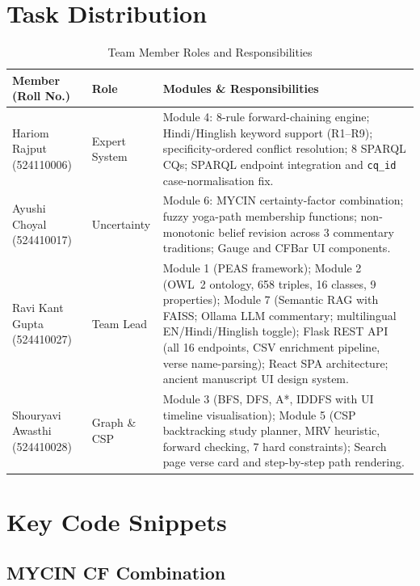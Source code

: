\documentclass[conference]{IEEEtran}
\begin{document}
\section{Task Distribution}

\begin{table}[htbp]
\caption{Team Member Roles and Responsibilities}
\label{tab:tasks}
\centering
\small
\begin{tabular}{p{2.5cm}p{1.8cm}p{10.6cm}}
\toprule
\textbf{Member (Roll No.)} & \textbf{Role} & \textbf{Modules \& Responsibilities} \\
\midrule
Hariom Rajput \newline (524110006)
  & Expert System
  & Module 4: 8-rule forward-chaining engine; Hindi/Hinglish keyword support (R1--R9); specificity-ordered conflict resolution; 8 SPARQL CQs; SPARQL endpoint integration and \texttt{cq\_id} case-normalisation fix. \\
\midrule
Ayushi Choyal \newline (524410017)
  & Uncertainty
  & Module 6: MYCIN certainty-factor combination; fuzzy yoga-path membership functions; non-monotonic belief revision across 3 commentary traditions; Gauge and CFBar UI components. \\
\midrule
Ravi Kant Gupta \newline (524410027)
  & Team Lead
  & Module 1 (PEAS framework); Module 2 (OWL~2 ontology, 658 triples, 16 classes, 9 properties); Module 7 (Semantic RAG with FAISS; Ollama LLM commentary; multilingual EN/Hindi/Hinglish toggle); Flask REST API (all 16 endpoints, CSV enrichment pipeline, verse name-parsing); React SPA architecture; ancient manuscript UI design system. \\
\midrule
Shouryavi Awasthi \newline (524410028)
  & Graph \& CSP
  & Module 3 (BFS, DFS, A*, IDDFS with UI timeline visualisation); Module 5 (CSP backtracking study planner, MRV heuristic, forward checking, 7 hard constraints); Search page verse card and step-by-step path rendering. \\
\bottomrule
\end{tabular}
\end{table}

\section{Key Code Snippets}

\subsection{MYCIN CF Combination}
\end{document}
